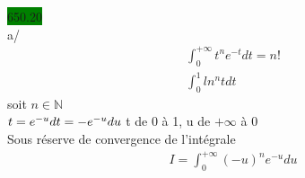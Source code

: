 \documentclass{article}
\begin{document}
\noindent \colorbox{green}{650.20}\\
a/ 
\begin{align*}
    \int_{0}^{+\infty}t^{n}e^{-t}dt = n! \\
    \int_{0}^{1}ln^{n}t dt 
\end{align*}
soit \(n \in \mathbb{N}\)\\
\(
t = e^{-u}\\
dt = -e^{-u}du
\)
t de 0 à 1, u de \(+\infty\) à 0\\ 
Sous réserve de convergence de l'intégrale
\begin{align*}
    I = \int_{0}^{+\infty}(-u)^{n}e^{-u}du
\end{align*}
\end{document}
